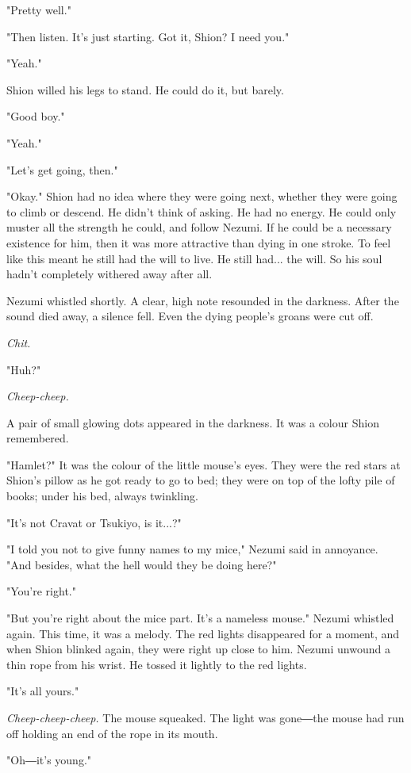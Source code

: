 "Pretty well."

"Then listen. It's just starting. Got it, Shion? I need you."

"Yeah."

Shion willed his legs to stand. He could do it, but barely.

"Good boy."

"Yeah."

"Let's get going, then."

"Okay." Shion had no idea where they were going next, whether they were
going to climb or descend. He didn't think of asking. He had no energy.
He could only muster all the strength he could, and follow Nezumi. If he
could be a necessary existence for him, then it was more attractive than
dying in one stroke. To feel like this meant he still had the will to
live. He still had... the will. So his soul hadn't completely withered
away after all.

Nezumi whistled shortly. A clear, high note resounded in the darkness.
After the sound died away, a silence fell. Even the dying people's
groans were cut off.

\emph{Chit.}

"Huh?"

\emph{Cheep-cheep.}

A pair of small glowing dots appeared in the darkness. It was a colour
Shion remembered.

"Hamlet?" It was the colour of the little mouse's eyes. They were the
red stars at Shion's pillow as he got ready to go to bed; they were on
top of the lofty pile of books; under his bed, always twinkling.

"It's not Cravat or Tsukiyo, is it...?"

"I told you not to give funny names to my mice," Nezumi said in
annoyance. "And besides, what the hell would they be doing here?"

"You're right."

"But you're right about the mice part. It's a nameless mouse." Nezumi
whistled again. This time, it was a melody. The red lights disappeared
for a moment, and when Shion blinked again, they were right up close to
him. Nezumi unwound a thin rope from his wrist. He tossed it lightly to
the red lights.

"It's all yours."

\emph{Cheep-cheep-cheep.} The mouse squeaked. The light was gone―the mouse had
run off holding an end of the rope in its mouth.

"Oh―it's young."

